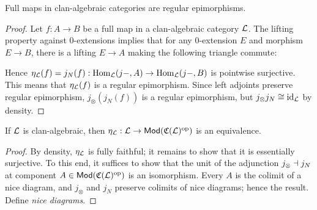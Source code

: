 \documentclass[a4paper]{article}
\begin{document}
\begin{lemma}
  Full maps in clan-algebraic categories are regular epimorphisms.
\end{lemma}
\begin{proof}
  Let $f : A \to B$ be a full map in a clan-algebraic category $\mathcal{L}$.
  The lifting property against 0-extensions implies that for any $0$-extension $E$ and morphism $E \to B$, there is a lifting $E \to A$ making the following triangle commute:
  \begin{center}
  \end{center}
  Hence $\eta_{\mathcal{L}}(f) = j_{N}(f) : \operatorname{\mathrm{Hom}_{\mathcal{L}}}(j-,A) \to \operatorname{\mathrm{Hom}_{\mathcal{L}}}(j-,B)$ is pointwise surjective.
  This means that $\eta_{\mathcal{L}}(f)$ is a regular epimorphism.
  Since left adjoints preserve regular epimorphism, $j_{\otimes}(j_N(f))$ is a regular epimorphism, but $j_{\otimes}j_N \cong \mathrm{id}_{\mathcal{L}}$ by density.
\end{proof}

\begin{theorem}
  If $\mathcal{L}$ is clan-algebraic, then $\eta_{\mathcal{L}} : \mathcal{L} \to \mathsf{Mod}(\mathfrak{C}(\mathcal{L})^{\mathrm{op}})$ is an equivalence.
\end{theorem}
\begin{proof}
  By density, $\eta_{\mathcal{L}}$ is fully faithful; it remains to show that it is essentially surjective.
  To this end, it suffices to show that the unit of the adjunction $j_{\otimes} \dashv j_{N}$ at component $A \in \mathsf{Mod}(\mathfrak{C}(\mathcal{L})^{\mathrm{op}})$ is an isomorphism.
  Every $A$ is the colimit of a nice diagram, and $j_{\otimes}$ and $j_N$ preserve colimits of nice diagrams; hence the result.
  \todo Define \emph{nice diagrams}.
\end{proof}

\printbibliography
\end{document}
